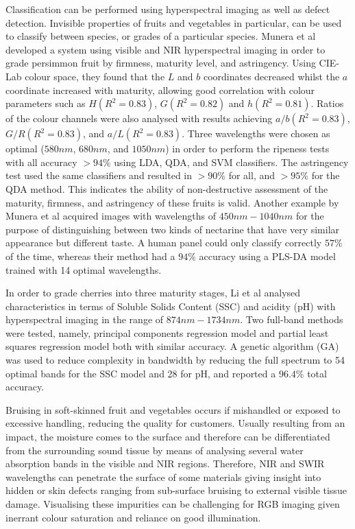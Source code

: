 \documentclass[fleqn,twoside,12pt]{report}
\begin{document}
Classification can be performed using hyperspectral imaging as well as defect detection. Invisible properties of fruits and vegetables in particular, can be used to classify between species, or grades of a particular species. Munera et al \cite{munera} developed a system using visible and NIR hyperspectral imaging in order to grade persimmon fruit by firmness, maturity level, and astringency. Using CIE-Lab colour space, they found that the $L$ and $b$ coordinates decreased whilst the $a$ coordinate increased with maturity, allowing good correlation with colour parameters such as $H(R^2 = 0.83)$, $G(R^2 = 0.82)$ and $h(R^2 = 0.81)$. Ratios of the colour channels were also analysed with results achieving $a/b(R^2 = 0.83)$, $G/R(R^2 = 0.83)$, and $a/L(R^2 = 0.83)$. Three wavelengths were chosen as optimal ($580nm$, $680nm$, and $1050nm$) in order to perform the ripeness tests with all accuracy $>94\%$ using LDA, QDA, and SVM classifiers. The astringency test used the same classifiers and resulted in $>90\%$ for all, and $>95\%$ for the QDA method. This indicates the ability of non-destructive assessment of the maturity, firmness, and astringency of these fruits is valid. Another example by Munera et al \cite{munera2} acquired images with wavelengths of $450nm-1040nm$ for the purpose of distinguishing between two kinds of nectarine that have very similar appearance but different taste. A human panel could only classify correctly $57\%$ of the time, whereas their method had a $94\%$ accuracy using a PLS-DA model trained with 14 optimal wavelengths. 

In order to grade cherries into three maturity stages, Li et al \cite{li} analysed characteristics in terms of Soluble Solids Content (SSC) and acidity (pH) with hyperspectral imaging in the range of $874nm-1734nm$. Two full-band methods were tested, namely, principal components regression model and partial least squares regression model both with similar accuracy. A genetic algorithm (GA) was used to reduce complexity in bandwidth by reducing the full spectrum to 54 optimal bands for the SSC model and 28 for pH, and reported a $96.4\%$ total accuracy.  


Bruising in soft-skinned fruit and vegetables occurs if mishandled or exposed to excessive handling, reducing the quality for customers. Usually resulting from an impact, the moisture comes to the surface and therefore can be differentiated from the surrounding sound tissue by means of analysing several water absorption bands in the visible and NIR regions. Therefore, NIR and SWIR wavelengths can penetrate the surface of some materials giving insight into hidden or skin defects ranging from sub-surface bruising to external visible tissue damage. Visualising these impurities can be challenging for RGB imaging given inerrant colour saturation and reliance on good illumination. 
\end{document}
